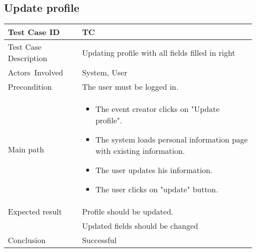 \newpage
\subsection{Update profile}

\begin{center} \begin{tabular}{|l|l|}
  \hline
  Test Case ID & TC \z\\
  \hline
  Test Case Description & Updating profile with all fields filled in right\\
  \hline
  Actors Involved & System, User\\
   \hline
  Precondition & The user must be logged in.\\
  \hline
  Main path &   \begin{minipage}{5in}
    \vskip 4pt
            \begin{itemize}
              \item The event creator clicks on "Update profile".
              \item The system loads personal information page with existing information.
              \item The user updates his information.
              \item The user clicks on "update" button.
            \end{itemize}
    \vskip 4pt
  \end{minipage}  \\
  \hline
  Expected result & Profile should be updated.\\
  & Updated fields should be changed\\
  \hline
  Conclusion & Successful\\
  \hline
\end{tabular} \end{center}

